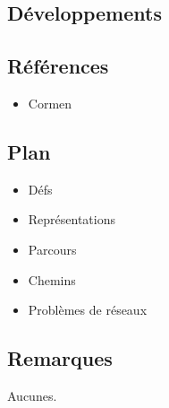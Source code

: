 \documentclass[../../agregation.tex]{subfiles}
\begin{document}

\subsection{Développements}

\dvts

\subsection{Références}

\begin{itemize}
	\item Cormen
	
\end{itemize}

\subsection{Plan}

\begin{itemize}
	\item Défs
	\item Représentations
	\item Parcours
	\item Chemins
	\item Problèmes de réseaux
\end{itemize}

\subsection{Remarques}

Aucunes.
\end{document}
